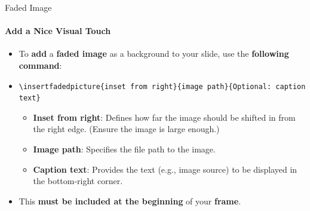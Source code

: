 \documentclass[aspectratio=169]{beamer}
\begin{document}
\begin{frame}{Faded Image}
    \framesubtitle{Add a Nice Visual Touch}

    \vspace{.6cm}

        \begin{coloredblock}
            \begin{itemize}
               \item To \textbf{add} a \textbf{faded image} as a background to your slide, use the \textbf{following command}:
                \item[] \begin{center}\footnotesize\texttt{\textbackslash insertfadedpicture\{inset from right\}\{image path\}\{Optional: caption text\}}\end{center}
                \begin{itemize}
                    \item \textbf{Inset from right}: Defines how far the image should be shifted in from the right edge. (Ensure the image is large enough.)
                    \item \textbf{Image path}: Specifies the file path to the image.
                    \item \textbf{Caption text}: Provides the text (e.g., image source) to be displayed in the bottom-right corner.
                \end{itemize}
                \item This \textbf{must be included at the beginning} of your \textbf{frame}.
            \end{itemize}     
        \end{coloredblock}

\end{frame}
\end{document}
